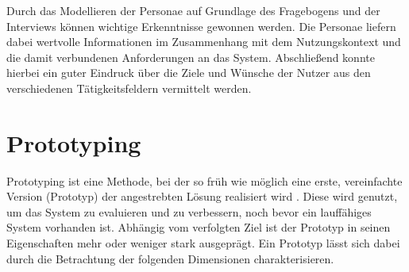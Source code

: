 
Durch das Modellieren der Personae auf Grundlage des Fragebogens und der Interviews können wichtige Erkenntnisse gewonnen werden. Die Personae liefern dabei wertvolle Informationen im Zusammenhang mit dem Nutzungskontext und die damit verbundenen Anforderungen an das System. Abschließend konnte hierbei ein guter Eindruck über die Ziele und Wünsche der Nutzer aus den verschiedenen Tätigkeitsfeldern vermittelt werden.

\clearpage
\section{Prototyping}
\label{sec:prototyping}

Prototyping ist eine Methode, bei der so früh wie möglich eine erste, vereinfachte Version (Prototyp) der angestrebten Lösung realisiert wird \cite[S. 25]{fuchs_requirements-engineering_2002}. Diese wird genutzt, um das System zu evaluieren und zu verbessern, noch bevor ein lauffähiges System vorhanden ist. Abhängig vom verfolgten Ziel ist der Prototyp in seinen Eigenschaften mehr oder weniger stark ausgeprägt. Ein Prototyp lässt sich dabei durch die Betrachtung der folgenden Dimensionen charakterisieren. \cite[S. 72-73]{richter_usability_2016}

